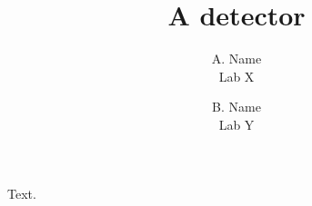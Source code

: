 \documentclass{JINST_mod}
\title{A detector}
\author{A. Name\\ Lab X\\ \email{a@x.org}}
\author{B. Name\\ Lab Y}
\begin{document}
Text. \jinstmodnote
\end{document}

